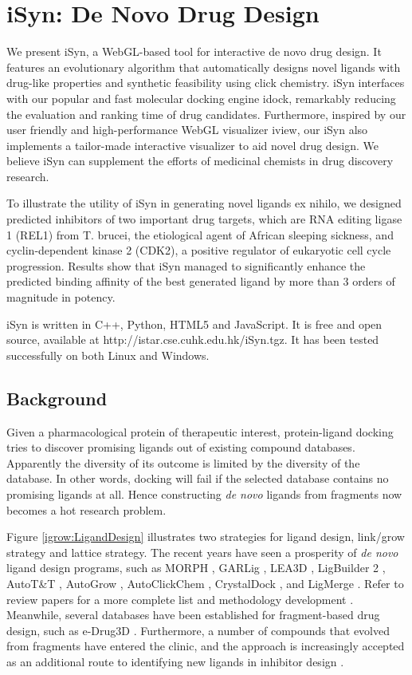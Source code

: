 \chapter{iSyn: De Novo Drug Design}

We present iSyn, a WebGL-based tool for interactive de novo drug design. It features an evolutionary algorithm that automatically designs novel ligands with drug-like properties and synthetic feasibility using click chemistry. iSyn interfaces with our popular and fast molecular docking engine idock, remarkably reducing the evaluation and ranking time of drug candidates. Furthermore, inspired by our user friendly and high-performance WebGL visualizer iview, our iSyn also implements a tailor-made interactive visualizer to aid novel drug design. We believe iSyn can supplement the efforts of medicinal chemists in drug discovery research.

To illustrate the utility of iSyn in generating novel ligands ex nihilo, we designed predicted inhibitors of two important drug targets, which are RNA editing ligase 1 (REL1) from T. brucei, the etiological agent of African sleeping sickness, and cyclin-dependent kinase 2 (CDK2), a positive regulator of eukaryotic cell cycle progression. Results show that iSyn managed to significantly enhance the predicted binding affinity of the best generated ligand by more than 3 orders of magnitude in potency.

iSyn is written in C++, Python, HTML5 and JavaScript. It is free and open source, available at http://istar.cse.cuhk.edu.hk/iSyn.tgz. It has been tested successfully on both Linux and Windows.

\section{Background}

Given a pharmacological protein of therapeutic interest, protein-ligand docking tries to discover promising ligands out of existing compound databases. Apparently the diversity of its outcome is limited by the diversity of the database. In other words, docking will fail if the selected database contains no promising ligands at all. Hence constructing \textit{de novo} ligands from fragments now becomes a hot research problem.

Figure \ref{igrow:LigandDesign} \citep{363} illustrates two strategies for ligand design, link/grow strategy and lattice strategy. The recent years have seen a prosperity of \textit{de novo} ligand design programs, such as MORPH \citep{365}, GARLig \citep{471}, LEA3D \citep{1223}, LigBuilder 2 \citep{749}, AutoT\&T \citep{780}, AutoGrow \citep{466}, AutoClickChem \citep{1051}, CrystalDock \citep{954}, and LigMerge \citep{1181}. Refer to review papers for a more complete list \citep{363,367,472,1006} and methodology development \citep{470,982}. Meanwhile, several databases have been established for fragment-based drug design, such as e-Drug3D \citep{1125}. Furthermore, a number of compounds that evolved from fragments have entered the clinic, and the approach is increasingly accepted as an additional route to identifying new ligands in inhibitor design \citep{363,367,472,474,1006}.

